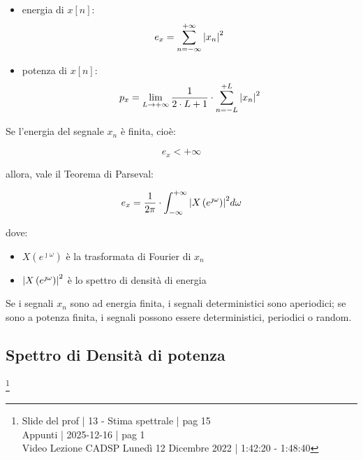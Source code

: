 \begin{itemize}
    \item energia di $x \left[ n\right]$: 
    {
        \Large 
        \begin{equation}
            e_{x} = \sum_{n = - \infty}^{+ \infty} \abs{x_{n}}^{2}
        \end{equation}
    }
    \item potenza di $x \left[ n\right]$: 
    {
        \Large 
        \begin{equation}
            p_{x} 
            = 
            \lim_{L \to + \infty}
            \dfrac{1}{2 \cdot L + 1} 
            \cdot 
            \sum_{n = - L}^{+ L}
            \abs{x_{n}}^{2}
        \end{equation}
    }
\end{itemize}

Se l'energia del segnale $x_{n}$ è finita, cioè: 

{
    \Large 
    \begin{equation}
        e_{x} < + \infty
    \end{equation}
}

allora, vale il Teorema di Parseval: 

{
    \Large 
    \begin{equation}
        e_{x} = \dfrac{1}{2 \pi} \cdot \int_{- \infty}^{+ \infty} \abs{X \left(e^{\jmath \omega}\right)}^{2} d \omega
    \end{equation}
}

dove: 

\begin{itemize}
    \item $X \left(e^{\jmath \omega}\right)$ è la trasformata di Fourier di $x_{n}$ 
    \item $\abs{X \left(e^{\jmath \omega}\right)}^{2}$ è lo spettro di densità di energia
\end{itemize}

Se i segnali $x_{n}$ sono ad energia finita, i segnali deterministici sono aperiodici; 
se sono a potenza finita, i segnali possono essere deterministici, periodici o random. \newline 

\newpage 

\subsection{Spettro di Densità di potenza}

\footnote{ 
    Slide del prof | 13 - Stima spettrale | pag 15\\
    Appunti | 2025-12-16 | pag 1\\
    Video Lezione CADSP Lunedì 12 Dicembre 2022 | 1:42:20 - 1:48:40  
}


